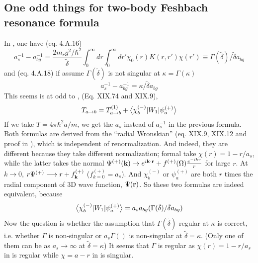 \subsection{One odd things for two-body Feshbach resonance formula\label{sec:LeggettAndMessiah}}
In \cite{Leggett},  one have (eq. 4.A.16)
\begin{equation}\label{eq:20100920:leggett}
a^{-1}_{s}-a^{-1}_{bg}=\frac{2m_{r}g^{2}/\hbar^{2}}{\tilde\delta}\int^{\infty}_{0}dr\int_{0}^{\infty}{dr'}\chi_{0}(r)K(r,r')\chi(r')\equiv{}\Gamma(\tilde\delta)/\tilde{\delta}a_{bg}
\end{equation}
and (eq. 4.A.18) if assume $\Gamma(\tilde\delta)$ is not singular at $\kappa=\Gamma(\kappa)$
\begin{equation}\label{eq:20100920:messiah}
a^{-1}_{s}-a^{-1}_{bg}=\kappa/\tilde{\delta}a_{bg}
\end{equation}
 This seems is at odd to \cite{Messiah}, (Eq. XIX.74 and XIX.9),
\begin{equation}
T_{a\rightarrow{b}}=T^{(1)}_{a\rightarrow{b}}+\bigl<{\chi_{b}^{(-)}{\lvert{W_{1}}\rvert}\psi_{a}^{(+)}}\bigr>
\end{equation}
If we take $T=4\pi\hbar^{2}a/m$, we get the $a_{s}$ instead of $a_{s}^{-1}$ in the previous formula.  
Both formulas are derived from the ``radial Wronskian'' (eq. XIX.9, XIX.12 and proof in \cite{Messiah}), which is independent of renormalization.  And indeed, they are different because they take different normalization;  formal take $\chi(r)=1-r/a_{s}$, while the latter takes the normal $\Psi^{(+)}(\mathbf{k})\rightarrow{}e^{i\mathbf{k}\cdot\mathbf{r}}+f^{(+)}(\Omega)\frac{e^{-ikr}}{r}$ for large $r$.  At $k\longrightarrow0$, $r\Psi^{(+)}\longrightarrow{r+f^{(+)}_{\ensuremath{\mathbf{k}}}}$ ($f^{(+)}_{k=0}=a_s$). And $\chi_b^{(-)}$ or $\psi_a^{(+)}$ are both $r$ times the radial component of 3D wave function, $\Psi(\mathbf{r})$.  So these two formulas are indeed equivalent, because 
\[
\bigl<{\chi_{b}^{(-)}{\lvert{W_{1}}\rvert}\psi_{a}^{(+)}}\bigr>=a_{s}a_{bg}(\Gamma(\tilde\delta)/\tilde{\delta}a_{bg})
\]
Now the question is whether the assumption that $\Gamma(\tilde\delta)$ regular at $\kappa$ is correct, i.e. whether $\Gamma$ is non-singular or $a_{s}\Gamma()$ is non-singular at $\tilde\delta=\kappa$. (Only one of them can be as $a_{s}\rightarrow\infty$ at $\tilde\delta=\kappa$)  It seems that $\Gamma$ is regular as $\chi(r)=1-r/a_{s}$ in  is regular while $\chi=a-r$ in  is singular.  
